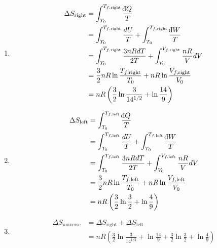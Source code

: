 \documentclass[a4paper,12pt]{article}
\def\dbar{{\mathchar'26\mkern-12mu \mathrm{d}}}
\begin{document}
\begin{enumerate}[label=\textbf{[\arabic*]}]
\begin{enumerate}
            \item
                \begin{align*}
                    \Delta S_{\text{right}} &= \int_{T_0}^{T_{f, \text{right}}} \frac{\dbar Q}{T} \\
                    &= \int_{T_0}^{T_{f, \text{right}}} \frac{dU}{T} + \int_{T_0}^{T_{f, \text{right}}} \frac{\dbar W}{T} \\
                    &= \int_{T_0}^{T_{f, \text{right}}} \frac{3nRdT}{2T} + \int_{V_0}^{V_{f, \text{right}}} \frac{nR}{V} dV \\
                    &= \frac{3}{2} nR \ln\frac{T_{f, \text{right}}}{T_0} + nR\ln\frac{V_{f, \text{right}}}{V_0} \\
                    &= nR \left( \frac{3}{2} \ln\frac{3}{14^{1/2}} + \ln\frac{14}{9} \right)
                \end{align*}

            \item
                \begin{align*}
                    \Delta S_{\text{left}} &= \int_{T_0}^{T_{f, \text{left}}} \frac{\dbar Q}{T} \\
                    &= \int_{T_0}^{T_{f, \text{left}}} \frac{dU}{T} + \int_{T_0}^{T_{f, \text{left}}} \frac{\dbar W}{T} \\
                    &= \int_{T_0}^{T_{f, \text{left}}} \frac{3nRdT}{2T} + \int_{V_0}^{V_{f, \text{left}}} \frac{nR}{V} dV \\
                    &= \frac{3}{2} nR \ln\frac{T_{f, \text{left}}}{T_0} + nR\ln\frac{V_{f, \text{left}}}{V_0} \\
                    &= nR \left( \frac{3}{2} \ln\frac{3}{2} + \ln\frac{4}{9} \right)
                \end{align*}

            \item
                \begin{align*}
                    \Delta S_{\text{universe}} &= \Delta S_{\text{right}} + \Delta S_{\text{left}} \\
                    &= nR \left( \frac{3}{2} \ln\frac{3}{14^{1/2}} + \ln\frac{14}{9} + \frac{3}{2} \ln\frac{3}{2} + \ln\frac{4}{9} \right)
                \end{align*}
        \end{enumerate}


\end{enumerate}
\end{document}
